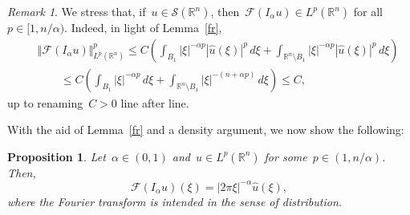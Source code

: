 \documentclass[11pt,hyp,]{nyjm}
\numberwithin{equation}{section}
\newcommand{\R}{\mathbb{R}}
\newtheorem{proposition}[theorem]{Proposition}
\theoremstyle{remark}
\newtheorem{remark}[theorem]{Remark}
\renewcommand{\leq}{\leqslant}
\begin{document}
\begin{remark}
We stress that, if~$u \in \mathcal{S}(\R^n)$, then~$\mathcal{F}(I_{\alpha}u) \in L^p(\R^n)$ for all~$p \in [1, n/\alpha)$. Indeed, in light of Lemma~\ref{fr},
\begin{eqnarray*}&&
\Vert \mathcal{F}(I_{\alpha}u)\Vert^p_{L^p(\R^n)} \leq C \left( \int_{B_1} |\xi|^{-\alpha p} | \widehat{u}(\xi)|^p \, d\xi + \int_{\R^n \setminus B_1} |\xi|^{-\alpha p} | \widehat{u}(\xi)|^p \, d\xi \right)\\ &&\qquad
\leq C   \left( \int_{B_1} |\xi|^{-\alpha p} \, d\xi + \int_{\R^n \setminus B_1} |\xi|^{-(n+\alpha p)} \, d\xi \right)\leq C
,
\end{eqnarray*}
up to renaming~$C>0$ line after line.
\end{remark}				
			
With the aid of Lemma~\ref{fr} and a density argument, we now show the following:
			
			\begin{proposition}\label{prdue}
				Let~$\alpha \in (0,1)$ and~$u \in L^p(\R^n)$ for some~$p \in (1, n/\alpha)$. Then,
				\[
				\mathcal{F}(I_{\alpha} u) (\xi)= | 2 \pi \xi|^{-\alpha}\widehat{u}(\xi),
				\]
				where the Fourier transform is intended in the sense of distribution.
			\end{proposition}
			
\end{document}
